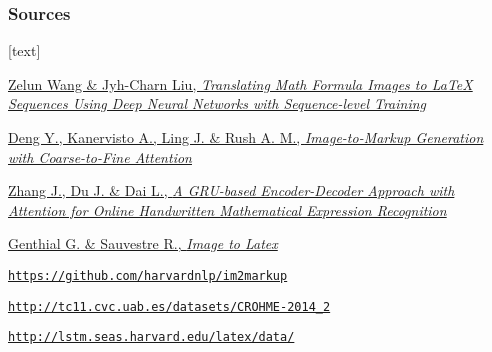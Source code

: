 \documentclass{beamer}
\begin{document}



\begin{frame}

\frametitle{Sources}

\footnotesize

\begin{thebibliography}{1}
[text]

    \href{https://arxiv.org/ftp/arxiv/papers/1908/1908.11415.pdf}{Zelun Wang \& Jyh-Charn Liu,
    \emph{Translating Math Formula Images to LaTeX Sequences Using Deep
    Neural Networks with Sequence-level Training}}
        
    \href{https://arxiv.org/pdf/1609.04938.pdf}{Deng Y., Kanervisto A., Ling J. \& Rush A. M.,
    \emph{Image-to-Markup Generation with Coarse-to-Fine Attention}}
    
    \href{https://arxiv.org/pdf/1712.03991.pdf}{Zhang J., Du J. \& Dai L.,
    \emph{A GRU-based Encoder-Decoder Approach with Attention for Online Handwritten Mathematical
    Expression Recognition}}
    
    \href{http://cs231n.stanford.edu/reports/2017/pdfs/815.pdf}{Genthial G. \& Sauvestre R.,
    \emph{Image to Latex}}
    
    \href{https://github.com/harvardnlp/im2markup}{\texttt{https://github.com/harvardnlp/im2markup}}

    \href{http://tc11.cvc.uab.es/datasets/CROHME-2014_2}{\texttt{http://tc11.cvc.uab.es/datasets/CROHME-2014\_2}}
    
    \href{http://lstm.seas.harvard.edu/latex/data/}{\texttt{http://lstm.seas.harvard.edu/latex/data/}}

\end{thebibliography}

\end{frame}
\end{document}
